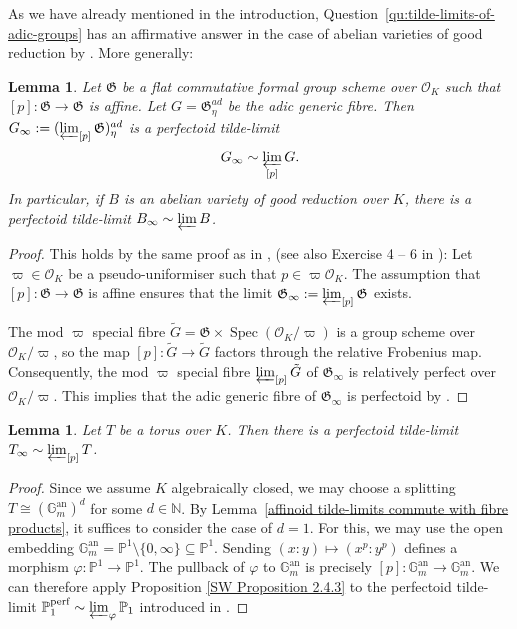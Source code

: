 \documentclass[10pt,oneside]{amsart}
\newtheorem{lemma}[theorem]{Lemma}
\theoremstyle{definition}
\newcommand{\Spec}{\operatorname{Spec}}
\newcommand{\an}{\mathrm{an}}
\renewcommand{\O}{\mathcal{O}}
\newcommand{\N}{\mathbb{N}}
\begin{document}
As we have already mentioned in the introduction, Question~\ref{qu:tilde-limits-of-adic-groups} has an affirmative answer in the case of abelian varieties of good reduction by \cite[Lemme~A.16]{Pilloni-Stroh}. More generally:
\begin{lemma}\label{tilde-limit exists and is perfectoid in the good reduction case}
		Let $\mathfrak G$ be a flat commutative formal group scheme over $\O_K$ such that $[p]:\mathfrak G\to\mathfrak G$ is affine. Let $G=\mathfrak G^{ad}_{\eta}$ be the adic generic fibre. Then $G_\infty := (\varprojlim_{[p]}\mathfrak G)^{ad}_\eta$ is a perfectoid tilde-limit
		\[G_\infty\sim \varprojlim_{[p]} G. \]
		In particular, if $B$ is an abelian variety of good reduction over $K$, there is a perfectoid tilde-limit $B_\infty\sim \varprojlim B$.
	\end{lemma}
\begin{proof}
	This holds by the same proof as in \cite[Lemme~A.16]{Pilloni-Stroh}, (see also Exercise 4 -- 6 in \cite{Bhatt}):
	 Let $\varpi\in\mathcal O_K$ be a pseudo-uniformiser such that $p\in \varpi\mathcal O_K$. The assumption that $[p]:\mathfrak G\to \mathfrak G$ is affine ensures that the limit $\mathfrak G_{\infty}:=\varprojlim_{[p]}\mathfrak G$ exists.
	 
	The mod $\varpi$ special fibre $\tilde{G} = \mathfrak G\times \Spec(\O_K/\varpi)$ is a group scheme over $\mathcal O_K/\varpi$, so the map $[p]\colon\tilde{G}\rightarrow \tilde{G}$ factors through the relative Frobenius map. Consequently, the mod $\varpi$ special fibre $\varprojlim_{[p]}\tilde{G}$ of $\mathfrak G_{\infty}$ is relatively perfect over $\mathcal O_K/\varpi$. This implies that the adic generic fibre of $\mathfrak G_{\infty}$ is perfectoid by \cite[Theorem~5.2]{perfectoid}.
\end{proof}
\begin{lemma}
	Let $T$ be a torus over $K$. Then there is a perfectoid tilde-limit $T_\infty\sim \varprojlim_{[p]} T$.
\end{lemma}
\begin{proof}
Since we assume $K$ algebraically closed, we may choose a splitting $T\cong (\mathbb{G}_m^{\an})^d$ for some $d\in \N$. By Lemma~\ref{affinoid tilde-limits commute with fibre products}, it suffices to consider the case of $d=1$. For this, we may use the open embedding $\mathbb G_m^{\an}= \mathbb P^1\setminus\{0, \infty\}\subseteq \mathbb P^1$. Sending $(x:y)\mapsto (x^p:y^p)$ defines a morphism $\varphi:\mathbb P^1\to \mathbb P^1$. The pullback of $\varphi$ to $\mathbb G_m^{\an}$ is precisely $[p]:\mathbb G_m^{\an}\to \mathbb G_m^{\an}$. We can therefore apply Proposition \ref{SW Proposition 2.4.3} to the perfectoid tilde-limit $\mathbb P_1^{\text{perf}}\sim \varprojlim_{\varphi} \mathbb P_1$ introduced in \cite{perfectoid}. 
\end{proof}
\end{document}
